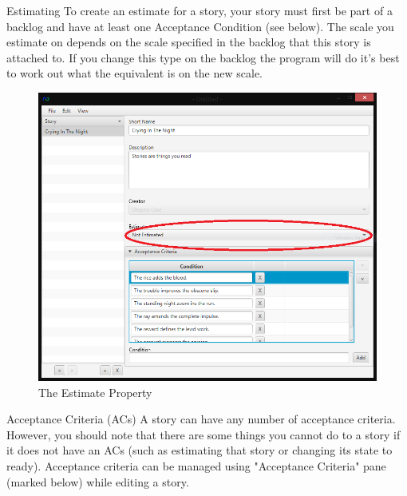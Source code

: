 Estimating\newline
To create an estimate for a story, your story must first be part of a backlog and have at least one Acceptance Condition (see below). The scale you estimate on depends on the scale specified in the backlog that this story is attached to. If you change this type on the backlog the program will do it's best to work out what the equivalent is on the new scale.

\begin{figure}[H]
\centering
\includegraphics[width=\textwidth]{images/screenshots/Estimate1.PNG}
\caption{The Estimate Property}
\label{fig:new_project}
\end{figure}

Acceptance Criteria (ACs)\newline
A story can have any number of acceptance criteria. However, you should note that there are some things you cannot do to a story if it does not have an ACs (such as estimating that story or changing its state to ready). Acceptance criteria can be managed using "Acceptance Criteria" pane (marked below) while editing a story.

